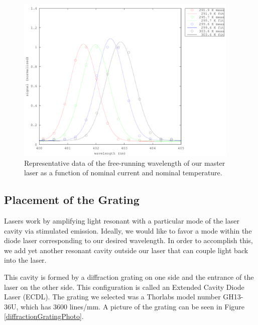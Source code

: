 \begin{figure}
\centering
\includegraphics[width=0.95\textwidth]{temperatureFit} 
\caption[Graph of Temperatures and Currents]{\label{3dCurrentandTgraph} Representative data of the free-running wavelength of our master laser as a function of nominal current and nominal temperature.}
\end{figure}

\subsection{Placement of the Grating}



Lasers work by amplifying light resonant with a particular mode of the laser cavity via stimulated emission. Ideally, we would like to favor a mode within the diode laser corresponding to our desired wavelength. In order to accomplish this, we add yet another resonant cavity outside our laser that can couple light back into the laser. 

This cavity is formed by a diffraction grating on one side and the entrance of the laser on the other side. This configuration is called an Extended Cavity Diode Laser (ECDL). The grating we selected was a Thorlabs model number GH13-36U, which has 3600 lines/mm. A picture of the grating can be seen in Figure\,\ref{diffractionGratingPhoto}. 


